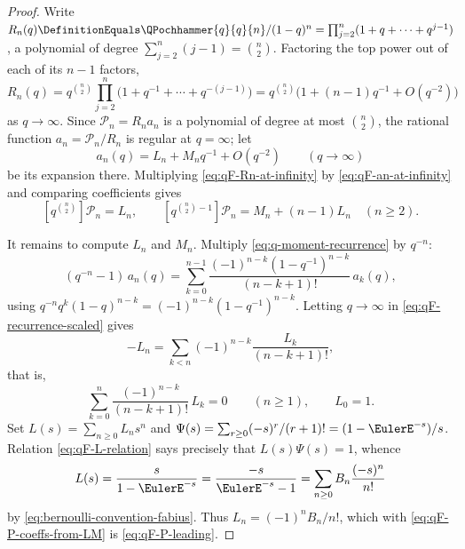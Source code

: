 \documentclass[11pt,a4paper,oneside,openany]{book}
\theoremstyle{definition}
\theoremstyle{remark}
\begin{document}
\begin{proof}
Write $R_n(q)\DefinitionEquals\QPochhammer{q}{q}{n}/(1-q)^n=\prod_{j=2}^{n}(1+q+\cdots+q^{j-1})$, a
polynomial of degree $\sum_{j=2}^n(j-1)=\binom n2$.  Factoring the top power out
of each of its $n-1$ factors,
\begin{equation}\label{eq:qF-Rn-at-infinity}
 R_n(q)=q^{\binom n2}\prod_{j=2}^{n}\bigl(1+q^{-1}+\cdots+q^{-(j-1)}\bigr)
       =q^{\binom n2}\bigl(1+(n-1)q^{-1}+O(q^{-2})\bigr)
\end{equation}
as $q\to\infty$.  Since $\mathcal P_n=R_na_n$ is a polynomial of degree at most
$\binom n2$, the rational function $a_n=\mathcal P_n/R_n$ is regular at
$q=\infty$; let
\begin{equation}\label{eq:qF-an-at-infinity}
 a_n(q)=L_n+M_nq^{-1}+O(q^{-2})
 \qquad(q\to\infty)
\end{equation}
be its expansion there.  Multiplying \eqref{eq:qF-Rn-at-infinity} by
\eqref{eq:qF-an-at-infinity} and comparing coefficients gives
\begin{equation}\label{eq:qF-P-coeffs-from-LM}
 [q^{\binom n2}]\mathcal P_n=L_n,
 \qquad
 [q^{\binom n2-1}]\mathcal P_n=M_n+(n-1)L_n\quad(n\ge2).
\end{equation}

It remains to compute $L_n$ and $M_n$.  Multiply
\eqref{eq:q-moment-recurrence} by $q^{-n}$:
\begin{equation}\label{eq:qF-recurrence-scaled}
 (q^{-n}-1)\,a_n(q)
 =\sum_{k=0}^{n-1}\frac{(-1)^{n-k}(1-q^{-1})^{n-k}}{(n-k+1)!}\,a_k(q),
\end{equation}
using $q^{-n}q^k(1-q)^{n-k}=(-1)^{n-k}(1-q^{-1})^{n-k}$.  Letting
$q\to\infty$ in \eqref{eq:qF-recurrence-scaled} gives
\[
 -L_n=\sum_{k<n}(-1)^{n-k}\frac{L_k}{(n-k+1)!},
\]
that is,
\begin{equation}\label{eq:qF-L-relation}
 \sum_{k=0}^{n}\frac{(-1)^{n-k}}{(n-k+1)!}\,L_k=0
 \qquad(n\ge1),
 \qquad L_0=1 .
\end{equation}
Set $L(s)=\sum_{n\ge0}L_ns^n$ and
$\Psi(s)=\sum_{r\ge0}(-s)^r/(r+1)!=(1-\EulerE^{-s})/s$.  Relation
\eqref{eq:qF-L-relation} says precisely that $L(s)\Psi(s)=1$, whence
\[
 L(s)=\frac{s}{1-\EulerE^{-s}}=\frac{-s}{\EulerE^{-s}-1}
      =\sum_{n\ge0}B_n\frac{(-s)^n}{n!}
\]
by \eqref{eq:bernoulli-convention-fabius}.  Thus $L_n=(-1)^nB_n/n!$, which with
\eqref{eq:qF-P-coeffs-from-LM} is \eqref{eq:qF-P-leading}.


\end{proof}
\end{document}
